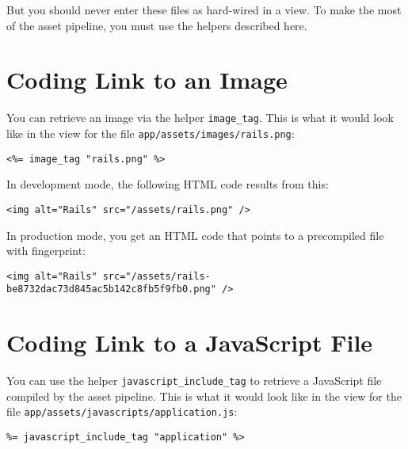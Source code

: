 \documentclass[a4paper]{book}
\newcounter{img}[chapter]
\begin{document}
But you should never enter these files as hard-wired in a view. To make the most of the asset pipeline, you must use the helpers described here.

\section{Coding Link to an Image}\label{coding-link-to-an-image}

You can retrieve an image via the helper \texttt{image\_tag}. This is what it would look like in the view for the file \texttt{app/assets/images/rails.png}:

\begin{shaded}\begin{verbatim}
<%= image_tag "rails.png" %>
\end{verbatim}\end{shaded}

In development mode, the following HTML code results from this:

\begin{shaded}\begin{verbatim}
<img alt="Rails" src="/assets/rails.png" />
\end{verbatim}\end{shaded}

In production mode, you get an HTML code that points to a precompiled file with fingerprint:

\begin{shaded}\begin{verbatim}
<img alt="Rails" src="/assets/rails-be8732dac73d845ac5b142c8fb5f9fb0.png" />
\end{verbatim}\end{shaded}

\section{Coding Link to a JavaScript File}\label{coding-link-to-a-javascript-file}

You can use the helper \texttt{javascript\_include\_tag} to retrieve a JavaScript file compiled by the asset pipeline. This is what it would look like in the view for the file \texttt{app/assets/javascripts/application.js}:

\begin{shaded}\begin{verbatim}
%= javascript_include_tag "application" %>
\end{verbatim}\end{shaded}
\end{document}
